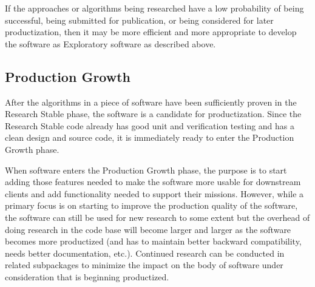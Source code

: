 \documentclass[11pt]{SANDreport}
\begin{document}
If the approaches or algorithms being researched have a low
probability of being successful, being submitted for publication, or
being considered for later productization, then it may be more
efficient and more appropriate to develop the software as Exploratory
software as described above.


%
{}\subsection{Production Growth}
%

After the algorithms in a piece of software have been sufficiently
proven in the Research Stable phase, the software is a candidate for
productization.  Since the Research Stable code already has good unit
and verification testing and has a clean design and source code, it is
immediately ready to enter the Production Growth phase.

\begin{figure}
\begin{center}
\end{center}
\end{figure}

When software enters the Production Growth phase, the purpose is to
start adding those features needed to make the software more usable
for downstream clients and add functionality needed to support their
missions.  However, while a primary focus is on starting to improve
the production quality of the software, the software can still be used
for new research to some extent but the overhead of doing research in
the code base will become larger and larger as the software becomes
more productized (and has to maintain better backward compatibility,
needs better documentation, etc.).  Continued research can be
conducted in related subpackages to minimize the impact on the body of
software under consideration that is beginning productized.
\end{document}
